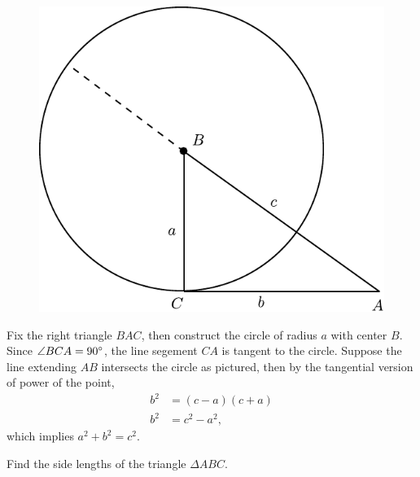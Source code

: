 \documentclass[twoside,10pt]{article}
\begin{document}
\begin{figure}[H]
	\centering
	\includegraphics[scale=0.7]{fig/54.pdf}
\end{figure}

Fix the right triangle $BAC$, then construct the circle of radius $a$ with center $B$. Since $\angle BCA=90^\circ$, the line segement $CA$ is tangent to the circle. Suppose the line extending $AB$ intersects the circle as pictured, then by the tangential version of power of the point,
\begin{align*}
	b^2 &= (c-a)(c+a) \\
	b^2 &= c^2-a^2,
\end{align*}
which implies $a^2+b^2=c^2$.

\newpage

\begin{exer}[1.57]
Find the side lengths of the triangle $\Delta ABC$.
\end{exer}
\end{document}
